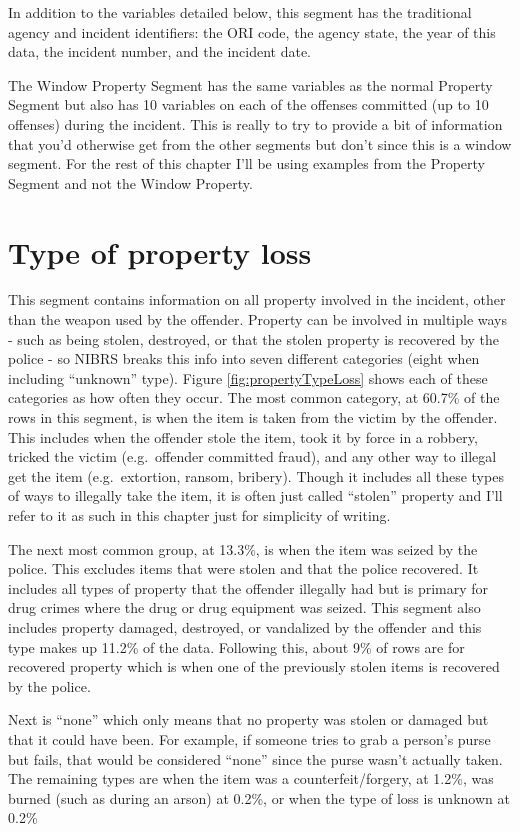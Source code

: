 \documentclass[
  12pt,
  openany]{book}
\begin{document}
In addition to the variables detailed below, this segment has the traditional agency and incident identifiers: the ORI code, the agency state, the year of this data, the incident number, and the incident date.

The Window Property Segment has the same variables as the normal Property Segment but also has 10 variables on each of the offenses committed (up to 10 offenses) during the incident. This is really to try to provide a bit of information that you'd otherwise get from the other segments but don't since this is a window segment. For the rest of this chapter I'll be using examples from the Property Segment and not the Window Property.

\section{Type of property loss}\label{propertyLoss}

This segment contains information on all property involved in the incident, other than the weapon used by the offender. Property can be involved in multiple ways - such as being stolen, destroyed, or that the stolen property is recovered by the police - so NIBRS breaks this info into seven different categories (eight when including ``unknown'' type). Figure \ref{fig:propertyTypeLoss} shows each of these categories as how often they occur. The most common category, at 60.7\% of the rows in this segment, is when the item is taken from the victim by the offender. This includes when the offender stole the item, took it by force in a robbery, tricked the victim (e.g.~offender committed fraud), and any other way to illegal get the item (e.g.~extortion, ransom, bribery). Though it includes all these types of ways to illegally take the item, it is often just called ``stolen'' property and I'll refer to it as such in this chapter just for simplicity of writing.

The next most common group, at 13.3\%, is when the item was seized by the police. This excludes items that were stolen and that the police recovered. It includes all types of property that the offender illegally had but is primary for drug crimes where the drug or drug equipment was seized. This segment also includes property damaged, destroyed, or vandalized by the offender and this type makes up 11.2\% of the data. Following this, about 9\% of rows are for recovered property which is when one of the previously stolen items is recovered by the police.

Next is ``none'' which only means that no property was stolen or damaged but that it could have been. For example, if someone tries to grab a person's purse but fails, that would be considered ``none'' since the purse wasn't actually taken. The remaining types are when the item was a counterfeit/forgery, at 1.2\%, was burned (such as during an arson) at 0.2\%, or when the type of loss is unknown at 0.2\%
\end{document}
